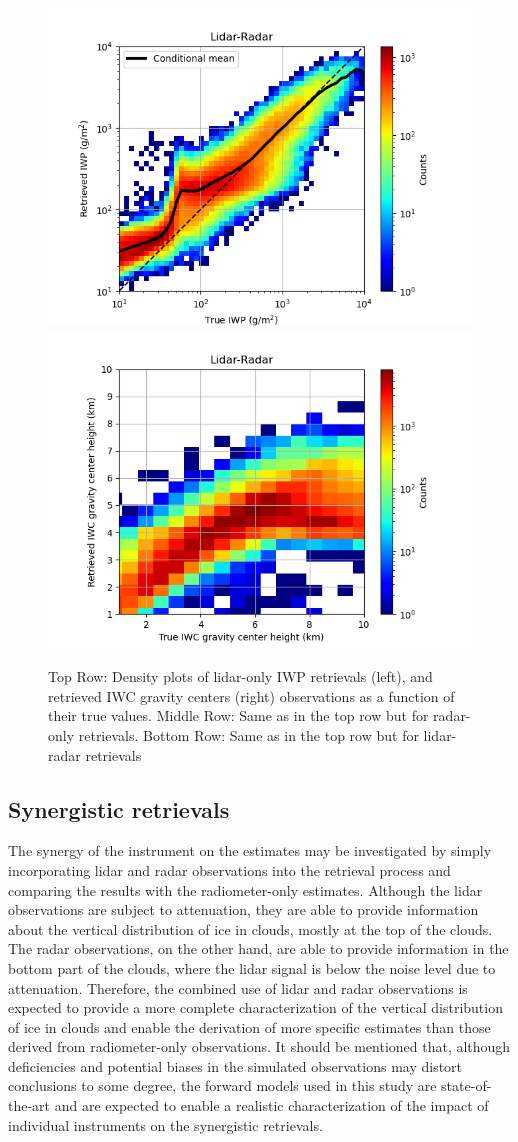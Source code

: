 \documentclass{ametsocV6.1}
\begin{document}
\begin{figure}
    \includegraphics[width=.481\linewidth]{fig7e0.png}
    \includegraphics[width=.481\linewidth]{fig7e.png}
    \caption{Top Row: Density plots of lidar-only IWP retrievals (left), and retrieved IWC gravity centers (right) observations as a function of their true values. Middle Row: Same as in the top row but for radar-only retrievals. Bottom Row: Same as in the top row but for lidar-radar retrievals}\label{f7}
\end{figure}

\subsection{Synergistic retrievals}

The synergy of the instrument on the estimates may be investigated by simply incorporating lidar and radar observations into the retrieval process and comparing the results with the radiometer-only estimates.  Although the lidar observations are subject to attenuation, they are able to provide information about the vertical distribution of ice in clouds, mostly at the top of the clouds. The radar observations, on the other hand, are able to provide information in the bottom part of the clouds, where the lidar signal is below the noise level due to attenuation. Therefore, the combined use of lidar and radar observations is expected to provide a more complete characterization of the vertical distribution of ice in clouds and enable the derivation of more specific estimates than those derived from radiometer-only observations. It should be mentioned that, although deficiencies and potential biases in the simulated observations may distort conclusions to some degree, the forward models used in this study are state-of-the-art and are expected to enable a realistic characterization of the impact of individual instruments on the synergistic retrievals.
\end{document}
